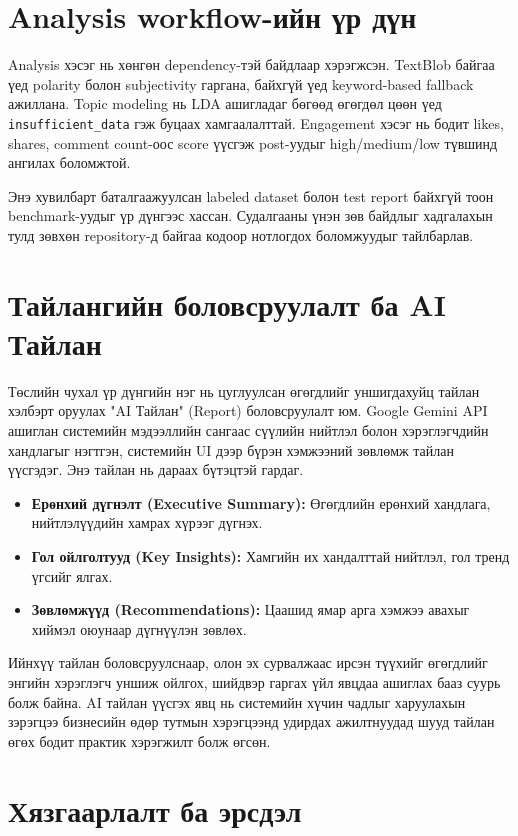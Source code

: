 \documentclass[
12pt,
oneside,
english,
onehalfspacing,
nolistspacing,
headsepline,
]{MUST-Thesis}
\begin{document}
\section{Analysis workflow-ийн үр дүн}

Analysis хэсэг нь хөнгөн dependency-тэй байдлаар хэрэгжсэн. TextBlob байгаа үед polarity болон subjectivity гаргана, байхгүй үед keyword-based fallback ажиллана. Topic modeling нь LDA ашигладаг бөгөөд өгөгдөл цөөн үед \texttt{insufficient\_data} гэж буцаах хамгаалалттай. Engagement хэсэг нь бодит likes, shares, comment count-оос score үүсгэж post-уудыг high/medium/low түвшинд ангилах боломжтой.

Энэ хувилбарт баталгаажуулсан labeled dataset болон test report байхгүй тоон benchmark-уудыг үр дүнгээс хассан. Судалгааны үнэн зөв байдлыг хадгалахын тулд зөвхөн repository-д байгаа кодоор нотлогдох боломжуудыг тайлбарлав.

\section{Тайлангийн боловсруулалт ба AI Тайлан}

Төслийн чухал үр дүнгийн нэг нь цуглуулсан өгөгдлийг уншигдахуйц тайлан хэлбэрт оруулах "AI Тайлан" (Report) боловсруулалт юм. Google Gemini API ашиглан системийн мэдээллийн сангаас сүүлийн нийтлэл болон хэрэглэгчдийн хандлагыг нэгтгэн, системийн UI дээр бүрэн хэмжээний зөвлөмж тайлан үүсгэдэг. Энэ тайлан нь дараах бүтэцтэй гардаг.

\begin{itemize}
    \item \textbf{Ерөнхий дүгнэлт (Executive Summary):} Өгөгдлийн ерөнхий хандлага, нийтлэлүүдийн хамрах хүрээг дүгнэх.
    \item \textbf{Гол ойлголтууд (Key Insights):} Хамгийн их хандалттай нийтлэл, гол тренд үгсийг ялгах.
    \item \textbf{Зөвлөмжүүд (Recommendations):} Цаашид ямар арга хэмжээ авахыг хиймэл оюунаар дүгнүүлэн зөвлөх.
\end{itemize}

Ийнхүү тайлан боловсруулснаар, олон эх сурвалжаас ирсэн түүхийг өгөгдлийг энгийн хэрэглэгч уншиж ойлгох, шийдвэр гаргах үйл явцдаа ашиглах бааз суурь болж байна. AI тайлан үүсгэх явц нь системийн хүчин чадлыг харуулахын зэрэгцээ бизнесийн өдөр тутмын хэрэгцээнд удирдах ажилтнуудад шууд тайлан өгөх бодит практик хэрэгжилт болж өгсөн.

\section{Хязгаарлалт ба эрсдэл}
\end{document}
